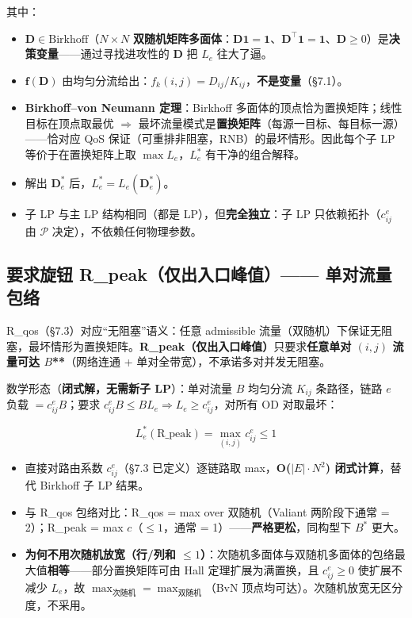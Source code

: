 \documentclass[11pt]{article}
\newcommand{\bv}{\mathbf}
\newcommand{\Pmat}{\mathcal{P}}
\begin{document}
其中：
\begin{itemize}
\item $\bv{D} \in \text{Birkhoff}$（$N \times N$ \textbf{双随机矩阵多面体}：$\bv{D}\bv{1} = \bv{1}$、$\bv{D}^{\top}\bv{1} = \bv{1}$、$\bv{D} \ge 0$）是\textbf{决策变量}——通过寻找进攻性的 $\bv{D}$ 把 $L_e$ 往大了逼。
\item $\bv{f}(\bv{D})$ 由均匀分流给出：$f_k(i,j) = D_{ij}/K_{ij}$，\textbf{不是变量}（§7.1）。
\item \textbf{Birkhoff–von Neumann 定理}：Birkhoff 多面体的顶点恰为置换矩阵；线性目标在顶点取最优 $\Rightarrow$ 最坏流量模式是\textbf{置换矩阵}（每源一目标、每目标一源）——恰对应 QoS 保证（可重排非阻塞，RNB）的最坏情形。因此每个子 LP 等价于在置换矩阵上取 $\max L_e$，$L_e^{*}$ 有干净的组合解释。
\item 解出 $\bv{D}_e^{*}$ 后，$L_e^{*} = L_e(\bv{D}_e^{*})$。
\item 子 LP 与主 LP 结构相同（都是 LP），但\textbf{完全独立}：子 LP 只依赖拓扑（$c_{ij}^{e}$ 由 $\Pmat$ 决定），不依赖任何物理参数。
\end{itemize}

\subsection{要求旋钮 R\_peak（仅出入口峰值）—— 单对流量包络}

R\_qos（§7.3）对应“无阻塞”语义：任意 admissible 流量（双随机）下保证无阻塞，最坏情形为置换矩阵。\textbf{R\_peak（仅出入口峰值）}只要求\textbf{任意单对 $(i,j)$ 流量可达 $B$**}（网络连通 + 单对全带宽），不承诺多对并发无阻塞。

数学形态（\textbf{闭式解，无需新子 LP}）：单对流量 $B$ 均匀分流 $K_{ij}$ 条路径，链路 $e$ 负载 $= c_{ij}^{e} B$；要求 $c_{ij}^{e} B \le B L_e \Rightarrow L_e \ge c_{ij}^{e}$，对所有 OD 对取最坏：

\begin{equation}
L_e^{*}(\text{R\_peak}) = \max_{(i,j)} c_{ij}^{e} \le 1
\end{equation}

\begin{itemize}
\item 直接对路由系数 $c_{ij}^{e}$（§7.3 已定义）逐链路取 max，\textbf{O($|E| \cdot N^2$) 闭式计算}，替代 Birkhoff 子 LP 结果。
\item 与 R\_qos 包络对比：R\_qos = max over 双随机（Valiant 两阶段下通常 = 2）；R\_peak = max $c$（$\le 1$，通常 = 1）——\textbf{严格更松}，同构型下 $B^*$ 更大。
\item \textbf{为何不用次随机放宽（行/列和 $\le 1$）}：次随机多面体与双随机多面体的包络最大值\textbf{相等}——部分置换矩阵可由 Hall 定理扩展为满置换，且 $c_{ij}^{e} \ge 0$ 使扩展不减少 $L_e$，故 $\max_{\text{次随机}} = \max_{\text{双随机}}$（BvN 顶点均可达）。次随机放宽无区分度，不采用。
\end{itemize}
\end{document}
